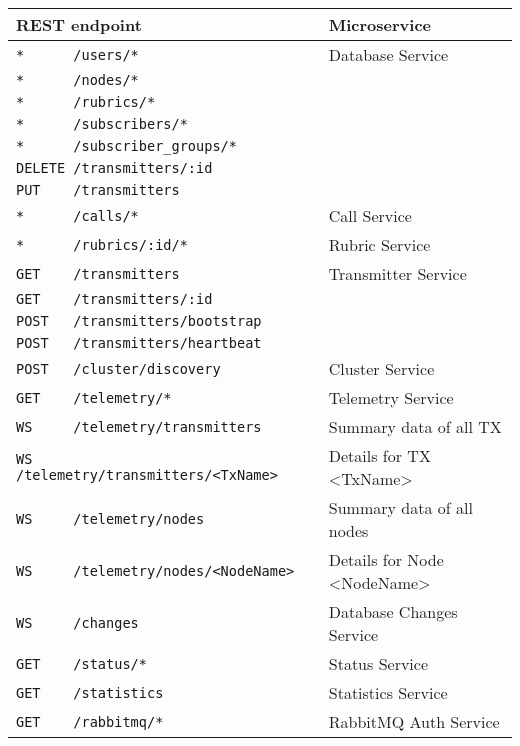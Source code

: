 \begin{center}
  \begin{tabular}{|l|l|} \hline
    REST endpoint & Microservice \\ \hline \hline

    \verb|*      /users/*| & Database Service \\
    \verb|*      /nodes/*| &  \\
    \verb|*      /rubrics/*| &  \\
    \verb|*      /subscribers/*| & \\
    \verb|*      /subscriber_groups/*| & \\
    \verb|DELETE /transmitters/:id| & \\
    \verb|PUT    /transmitters| & \\ \hline

    \verb|*      /calls/*| & Call Service \\ \hline

    \verb|*      /rubrics/:id/*| & Rubric Service \\ \hline

    \verb|GET    /transmitters| & Transmitter Service \\
    \verb|GET    /transmitters/:id| & \\
    \verb|POST   /transmitters/bootstrap| & \\
    \verb|POST   /transmitters/heartbeat| & \\ \hline

    \verb|POST   /cluster/discovery| & Cluster Service \\ \hline

    \verb|GET    /telemetry/*| & Telemetry Service \\ \hline
    \verb|WS     /telemetry/transmitters| & Summary data of all TX\\
    \verb|WS     /telemetry/transmitters/<TxName>| & Details for TX <TxName>\\
    \verb|WS     /telemetry/nodes| & Summary data of all nodes\\
    \verb|WS     /telemetry/nodes/<NodeName>| & Details for Node <NodeName>\\ \hline
    \verb|WS     /changes| & Database Changes Service \\ \hline

    \verb|GET    /status/*| & Status Service \\ \hline

    \verb|GET    /statistics| & Statistics Service \\ \hline

    \verb|GET    /rabbitmq/*| & RabbitMQ Auth Service \\ \hline
  \end{tabular}
\end{center}


